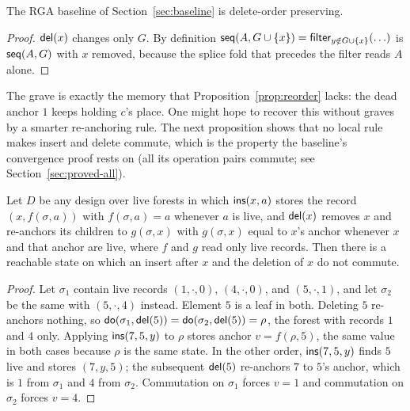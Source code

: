 \begin{proposition}
\label{prop:baseline-order}
The RGA baseline of Section~\ref{sec:baseline} is delete-order preserving.
\end{proposition}

\begin{proof}
$\mathsf{del}(x)$ changes only $G$. By definition
$\mathsf{seq}(A,G\cup\{x\})=\mathsf{filter}_{y\notin G\cup\{x\}}(\ldots)$ is
$\mathsf{seq}(A,G)$ with $x$ removed, because the splice fold that precedes the
filter reads $A$ alone.
\end{proof}

The grave is exactly the memory that Proposition~\ref{prop:reorder} lacks:
the dead anchor $1$ keeps holding $c$'s place. One might hope to recover
this without graves by a smarter re-anchoring rule. The next proposition
shows that no local rule makes insert and delete commute, which is the
property the baseline's convergence proof rests on (all its operation pairs
commute; see Section~\ref{sec:proved-all}).

\begin{proposition}
\label{prop:no-commute}
Let $D$ be any design over live forests in which
$\mathsf{ins}(x,a)$ stores the record $(x,f(\sigma,a))$ with $f(\sigma,a)=a$
whenever $a$ is live, and $\mathsf{del}(x)$ removes $x$ and re-anchors its children
to $g(\sigma,x)$ with $g(\sigma,x)$ equal to $x$'s anchor whenever $x$ and
that anchor are live, where $f$ and $g$ read only live records. Then there
is a reachable state on which an insert after $x$ and the deletion of $x$
do not commute.
\end{proposition}

\begin{proof}
Let $\sigma_1$ contain live records $(1,\cdot,0)$, $(4,\cdot,0)$, and
$(5,\cdot,1)$, and let $\sigma_2$ be the same with $(5,\cdot,4)$ instead.
Element $5$ is a leaf in both. Deleting $5$ re-anchors nothing, so
$\mathsf{do}(\sigma_1,\mathsf{del}(5))=\mathsf{do}(\sigma_2,\mathsf{del}(5))=\rho$, the
forest with records $1$ and $4$ only. Applying $\mathsf{ins}(7,5,y)$ to $\rho$
stores anchor $v=f(\rho,5)$, the same value in both cases because $\rho$ is
the same state. In the other order, $\mathsf{ins}(7,5,y)$ finds $5$ live and stores
$(7,y,5)$; the subsequent $\mathsf{del}(5)$ re-anchors $7$ to $5$'s anchor, which is
$1$ from $\sigma_1$ and $4$ from $\sigma_2$. Commutation on $\sigma_1$
forces $v=1$ and commutation on $\sigma_2$ forces $v=4$.
\end{proof}

